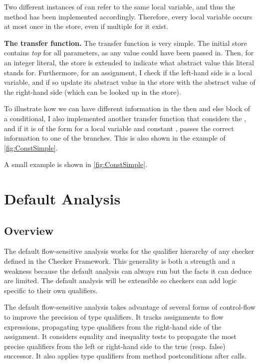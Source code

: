     Two different instances of  can refer to the same local variable, and thus
    the  method has been implemented accordingly. Therefore, every local variable occurs
    at most once in the store, even if multiple  for it exist.
    
    \textbf{The transfer function.} The transfer function is very simple. The initial store contains
    \emph{top} for all parameters, as any value could have been passed in. Then, for
    an integer literal, the store is extended to indicate what abstract value this literal
    stands for. Furthermore, for an assignment, I check if the left-hand side is
    a local variable, and if so update its abstract value in the
    store with the abstract value of the right-hand side (which can be looked up in the store).
    
    To illustrate how we can have different information in the then and else block of a conditional,
    I also implemented another transfer function that considers the , and if
    it is of the form  for a local variable  and constant , passes
    the correct information to one of the branches. This is also shown in the example of \autoref{fig:ConstSimple}.
    
     A small example is shown in \autoref{fig:ConstSimple}.




\section{Default Analysis}

\subsection{Overview}

The default flow-sensitive analysis  works for the qualifier hierarchy of any checker defined in 
the Checker Framework.  This generality is both a strength and a weakness because the 
default analysis can
always run but the facts it can deduce are limited.  The default analysis
will be extensible so checkers can add logic specific to their own qualifiers.

The default flow-sensitive analysis takes advantage of several forms of control-flow to improve the precision of type qualifiers.  It tracks assignments to flow expressions, propagating type qualifiers from the right-hand side of the assignment.  It considers equality and inequality tests to propagate the most precise qualifiers from the left or right-hand side to the true (resp. false) successor.  It also applies type qualifiers from method postconditions after calls.




